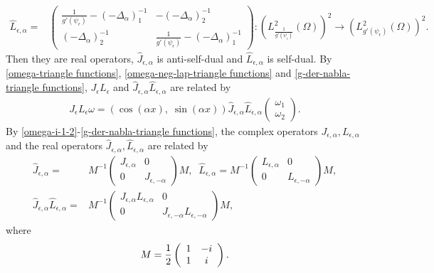 \documentclass[1 [leqno, 11pt]{amsart}
\numberwithin{equation}{section}
\let\ep=\epsilon
\begin{document}
\begin{CJK*}{GBK}{song}
\begin{align*}
 \hat {L}_{\epsilon, \alpha} =&
\left( \begin{array}{cc} \frac {1} {g'(\psi_\epsilon)} - (-\Delta_\alpha)_1^{-1} & -(-\Delta_\alpha)_2^{-1} \\ (-\Delta_\alpha)_2^{-1} & \frac {1} {g'(\psi_\epsilon)} - (-\Delta_\alpha)_1^{-1}  \end{array} \right)
 :\left(L^2_{\frac{1}{g'(\psi_\ep)}}(\Omega)\right)^2\to \left(L^2_{g'(\psi_\ep)}(\Omega)\right)^2.
\end{align*}
Then they are real operators,  $\hat{J}_{\ep,\alpha}$ is anti-self-dual and $\hat {L}_{\epsilon, \alpha}$ is self-dual. By \eqref{omega-triangle functions}, \eqref{omega-neg-lap-triangle functions} and \eqref{g-der-nabla-triangle functions}, $J_\epsilon L_\epsilon$ and $\hat{J}_{\ep,\alpha} \hat {L}_{\epsilon, \alpha}$ are related by
\begin{align*}
J_\epsilon L_\epsilon\omega=(\cos(\alpha x),\;\sin(\alpha x))\hat{J}_{\ep,\alpha} \hat {L}_{\epsilon, \alpha}\left( \begin{array}{cc} \omega_1 \\ \omega_2  \end{array} \right).
\end{align*}
By \eqref{omega-i-1-2}-\eqref{g-der-nabla-triangle functions},
 the  complex operators $J_{\ep,\alpha}, L_{\ep,\alpha}$ and the real  operators  $\hat{J}_{\ep,\alpha}, \hat {L}_{\epsilon, \alpha}$ are related by
\begin{align}\label{hat-J-L-alpha1}
\hat{J}_{\ep,\alpha}=&M^{-1}\left( \begin{array}{cc}J_{\ep,\alpha}  &0 \\0 & J_{\ep,-\alpha} \end{array} \right)M,\;\;
\hat{L}_{\ep,\alpha}=M^{-1}\left( \begin{array}{cc}L_{\ep,\alpha}  &0 \\0 & L_{\ep,-\alpha} \end{array} \right)M,\\\label{hat-J-L-alpha2}
\hat{J}_{\ep,\alpha}\hat{L}_{\ep,\alpha}=&M^{-1}\left( \begin{array}{cc}J_{\ep,\alpha}L_{\ep,\alpha}  &0 \\0 & J_{\ep,-\alpha}L_{\ep,-\alpha} \end{array} \right)M,
\end{align}
where
\begin{align*}
M={1\over2}\left( \begin{array}{cc}1  &-i \\1 & i \end{array} \right).

\end{align*}
\end{CJK*}
\end{document}
